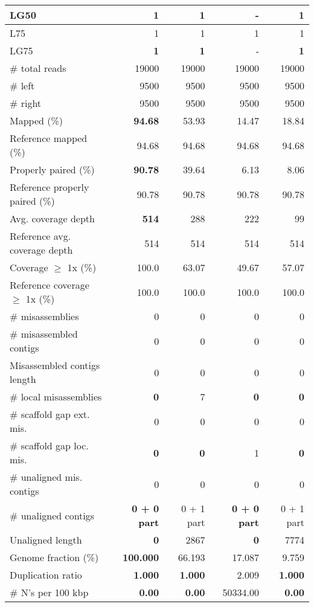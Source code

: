 \documentclass[12pt,a4paper]{article}
\begin{document}
\begin{table}[ht]
\begin{center}
\begin{tabular}{|l*{4}{|r}|}
LG50 & {\bf 1} & {\bf 1} & - & {\bf 1} \\ \hline
L75 & 1 & 1 & 1 & 1 \\ \hline
LG75 & {\bf 1} & {\bf 1} & - & {\bf 1} \\ \hline
\# total reads & 19000 & 19000 & 19000 & 19000 \\ \hline
\# left & 9500 & 9500 & 9500 & 9500 \\ \hline
\# right & 9500 & 9500 & 9500 & 9500 \\ \hline
Mapped (\%) & {\bf 94.68} & 53.93 & 14.47 & 18.84 \\ \hline
Reference mapped (\%) & 94.68 & 94.68 & 94.68 & 94.68 \\ \hline
Properly paired (\%) & {\bf 90.78} & 39.64 & 6.13 & 8.06 \\ \hline
Reference properly paired (\%) & 90.78 & 90.78 & 90.78 & 90.78 \\ \hline
Avg. coverage depth & {\bf 514} & 288 & 222 & 99 \\ \hline
Reference avg. coverage depth & 514 & 514 & 514 & 514 \\ \hline
Coverage $\geq$ 1x (\%) & 100.0 & 63.07 & 49.67 & 57.07 \\ \hline
Reference coverage $\geq$ 1x (\%) & 100.0 & 100.0 & 100.0 & 100.0 \\ \hline
\# misassemblies & 0 & 0 & 0 & 0 \\ \hline
\# misassembled contigs & 0 & 0 & 0 & 0 \\ \hline
Misassembled contigs length & 0 & 0 & 0 & 0 \\ \hline
\# local misassemblies & {\bf 0} & 7 & {\bf 0} & {\bf 0} \\ \hline
\# scaffold gap ext. mis. & 0 & 0 & 0 & 0 \\ \hline
\# scaffold gap loc. mis. & {\bf 0} & {\bf 0} & 1 & {\bf 0} \\ \hline
\# unaligned mis. contigs & 0 & 0 & 0 & 0 \\ \hline
\# unaligned contigs & {\bf 0 + 0 part} & 0 + 1 part & {\bf 0 + 0 part} & 0 + 1 part \\ \hline
Unaligned length & {\bf 0} & 2867 & {\bf 0} & 7774 \\ \hline
Genome fraction (\%) & {\bf 100.000} & 66.193 & 17.087 & 9.759 \\ \hline
Duplication ratio & {\bf 1.000} & {\bf 1.000} & 2.009 & {\bf 1.000} \\ \hline
\# N's per 100 kbp & {\bf 0.00} & {\bf 0.00} & 50334.00 & {\bf 0.00} \\ \hline

\end{tabular}
\end{center}
\end{table}
\end{document}
